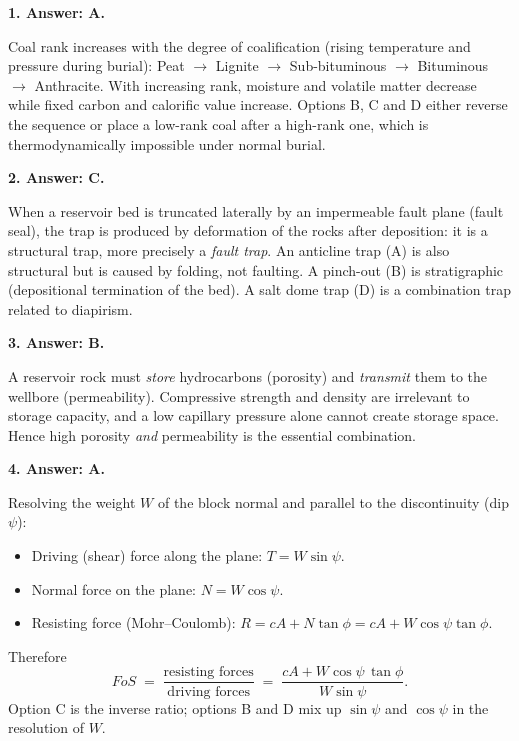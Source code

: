 \documentclass[11pt]{article}
\newcommand{\cle}[1]{{\popxbold\color{popdark}#1}}
\begin{document}
\begin{corrige}
\textbf{1. Answer: A.}\par
Coal rank increases with the degree of \cle{coalification} (rising temperature and pressure during burial): Peat $\rightarrow$ Lignite $\rightarrow$ Sub-bituminous $\rightarrow$ Bituminous $\rightarrow$ Anthracite. With increasing rank, moisture and volatile matter decrease while fixed carbon and calorific value increase. Options B, C and D either reverse the sequence or place a low-rank coal after a high-rank one, which is thermodynamically impossible under normal burial.

\textbf{2. Answer: C.}\par
When a reservoir bed is truncated laterally by an \cle{impermeable fault plane} (fault seal), the trap is produced by deformation of the rocks after deposition: it is a \cle{structural trap}, more precisely a \emph{fault trap}. An anticline trap (A) is also structural but is caused by folding, not faulting. A pinch-out (B) is stratigraphic (depositional termination of the bed). A salt dome trap (D) is a combination trap related to diapirism.

\textbf{3. Answer: B.}\par
A reservoir rock must \emph{store} hydrocarbons (\cle{porosity}) and \emph{transmit} them to the wellbore (\cle{permeability}). Compressive strength and density are irrelevant to storage capacity, and a low capillary pressure alone cannot create storage space. Hence high porosity \emph{and} permeability is the essential combination.

\textbf{4. Answer: A.}\par
Resolving the weight $W$ of the block normal and parallel to the discontinuity (dip $\psi$):
\begin{itemize}
\item Driving (shear) force along the plane: $T = W\sin\psi$.
\item Normal force on the plane: $N = W\cos\psi$.
\item Resisting force (Mohr--Coulomb): $R = cA + N\tan\phi = cA + W\cos\psi\tan\phi$.
\end{itemize}
Therefore
\[
FoS \;=\; \frac{\text{resisting forces}}{\text{driving forces}} \;=\; \frac{cA + W\cos\psi\,\tan\phi}{W\sin\psi}.
\]
Option C is the inverse ratio; options B and D mix up $\sin\psi$ and $\cos\psi$ in the resolution of $W$.
\end{corrige}
\end{document}
